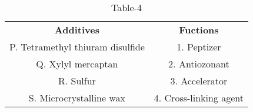 \begin{table}[htbp]
  \centering
  \caption{Table-4}
  \label{table4}
  \begin{tabular}{cc}
\textbf{Additives} & \textbf{Fuctions} \\

P. Tetramethyl thiuram disulfide & 1. Peptizer \\
Q. Xylyl mercaptan & 2. Antiozonant\\
R. Sulfur & 3. Accelerator \\
S. Microcrystalline wax & 4. Cross-linking agent \\
  
  
  
  \end{tabular}
\end{table}







